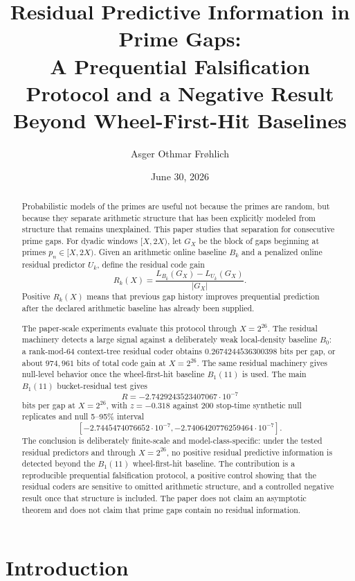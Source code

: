 \documentclass[11pt]{article}
\title{Residual Predictive Information in Prime Gaps:\\
A Prequential Falsification Protocol and a Negative Result Beyond Wheel-First-Hit Baselines}
\author{Asger Othmar Fr{\o}hlich}
\date{June 30, 2026}
\begin{document}
\maketitle

\begin{abstract}
Probabilistic models of the primes are useful not because the primes are random, but because they separate arithmetic structure that has been explicitly modeled from structure that remains unexplained. This paper studies that separation for consecutive prime gaps. For dyadic windows $[X,2X)$, let $G_X$ be the block of gaps beginning at primes $p_n\in[X,2X)$. Given an arithmetic online baseline $B_k$ and a penalized online residual predictor $U_k$, define the residual code gain
\[
R_k(X)=\frac{L_{B_k}(G_X)-L_{U_k}(G_X)}{|G_X|}.
\]
Positive $R_k(X)$ means that previous gap history improves prequential prediction after the declared arithmetic baseline has already been supplied.

The paper-scale experiments evaluate this protocol through $X=2^{26}$. The residual machinery detects a large signal against a deliberately weak local-density baseline $B_0$: a rank-mod-64 context-tree residual coder obtains $0.2674244536300398$ bits per gap, or about $974{,}961$ bits of total code gain at $X=2^{26}$. The same residual machinery gives null-level behavior once the wheel-first-hit baseline $B_1(11)$ is used. The main $B_1(11)$ bucket-residual test gives
\[
R=-2.7429243523407067\cdot10^{-7}
\]
bits per gap at $X=2^{26}$, with $z=-0.318$ against 200 stop-time synthetic null replicates and null 5--95\% interval
\[
[-2.7445474076652\cdot10^{-7},-2.7406420776259464\cdot10^{-7}].
\]
The conclusion is deliberately finite-scale and model-class-specific: under the tested residual predictors and through $X=2^{26}$, no positive residual predictive information is detected beyond the $B_1(11)$ wheel-first-hit baseline. The contribution is a reproducible prequential falsification protocol, a positive control showing that the residual coders are sensitive to omitted arithmetic structure, and a controlled negative result once that structure is included. The paper does not claim an asymptotic theorem and does not claim that prime gaps contain no residual information.
\end{abstract}

\section{Introduction}
\end{document}
